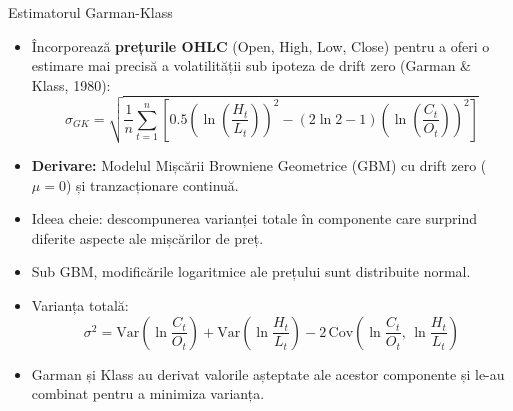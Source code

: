 \documentclass[9pt, aspectratio=169, t]{beamer}
\theoremstyle{definition}
\newcommand{\Var}{\text{Var}}
\newcommand{\Cov}{\text{Cov}}
\begin{document}
\begin{frame}{Estimatorul Garman-Klass}
\begin{itemize}
    \item Încorporează \textbf{prețurile OHLC} (Open, High, Low, Close) pentru a oferi o estimare mai precisă a volatilității sub ipoteza de drift zero (Garman \& Klass, 1980):
    \[
    \sigma_{GK} = \sqrt{\frac{1}{n}\sum_{t=1}^{n}\left[0.5\left(\ln\left(\frac{H_t}{L_t}\right)\right)^2 - (2\ln 2 - 1)\left(\ln\left(\frac{C_t}{O_t}\right)\right)^2\right]}
    \]
    \item \textbf{Derivare:} Modelul Mișcării Browniene Geometrice (GBM) cu drift zero ($\mu=0$) și tranzacționare continuă.
    \item Ideea cheie: descompunerea varianței totale în componente care surprind diferite aspecte ale mișcărilor de preț.
    \item Sub GBM, modificările logaritmice ale prețului sunt distribuite normal.
    \item Varianța totală:
    \[
    \sigma^2 = \Var\!\left(\ln\frac{C_t}{O_t}\right) + \Var\!\left(\ln\frac{H_t}{L_t}\right) - 2\,\Cov\!\left(\ln\frac{C_t}{O_t},\, \ln\frac{H_t}{L_t}\right)
    \]
    \item Garman și Klass au derivat valorile așteptate ale acestor componente și le-au combinat pentru a minimiza varianța.
\end{itemize}
\end{frame}
\end{document}
